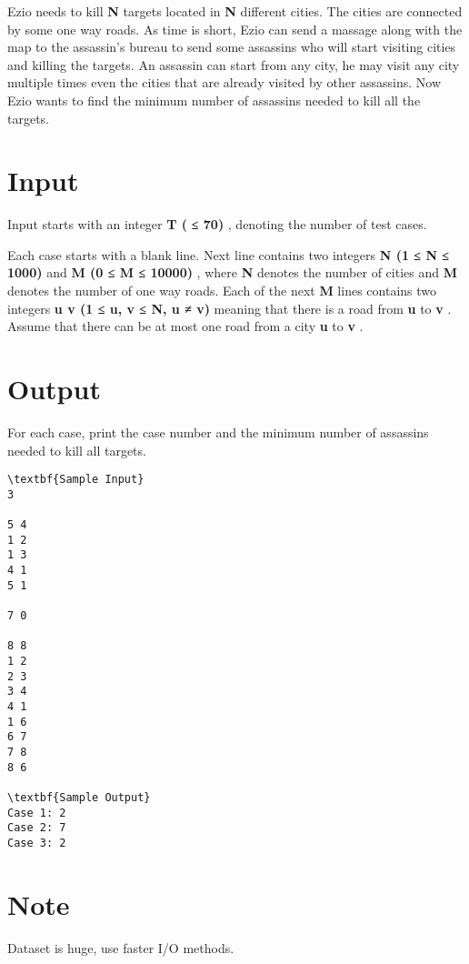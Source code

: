 

Ezio needs to kill \textbf{ N } targets located in \textbf{ N } different cities. The cities are connected by some one way roads. As time is short, Ezio can send a massage along with the map to the assassin's bureau to send some assassins who will start visiting cities and killing the targets. An assassin can start from any city, he may visit any city multiple times even the cities that are already visited by other assassins. Now Ezio wants to find the minimum number of assassins needed to kill all the targets.

\section{Input}

Input starts with an integer \textbf{ T ( }\textbf{ ≤ 70) } , denoting the number of test cases.

Each case starts with a blank line. Next line contains two integers \textbf{ N (1 ≤ N ≤ 1000) } and \textbf{ M (0 ≤ M ≤ 10000) } , where \textbf{ N } denotes the number of cities and \textbf{ M } denotes the number of one way roads. Each of the next \textbf{ M } lines contains two integers \textbf{ u v (1 ≤ u, v ≤ N, u ≠ v) } meaning that there is a road from \textbf{ u } to \textbf{ v } . Assume that there can be at most one road from a city \textbf{ u } to \textbf{ v } .

\section{Output}

For each case, print the case number and the minimum number of assassins needed to kill all targets.
\begin{verbatim}
\textbf{Sample Input}
3

5 4
1 2
1 3
4 1
5 1

7 0

8 8
1 2
2 3
3 4
4 1
1 6
6 7
7 8
8 6

\textbf{Sample Output}
Case 1: 2
Case 2: 7
Case 3: 2\end{verbatim}

\section{Note}

Dataset is huge, use faster I/O methods.